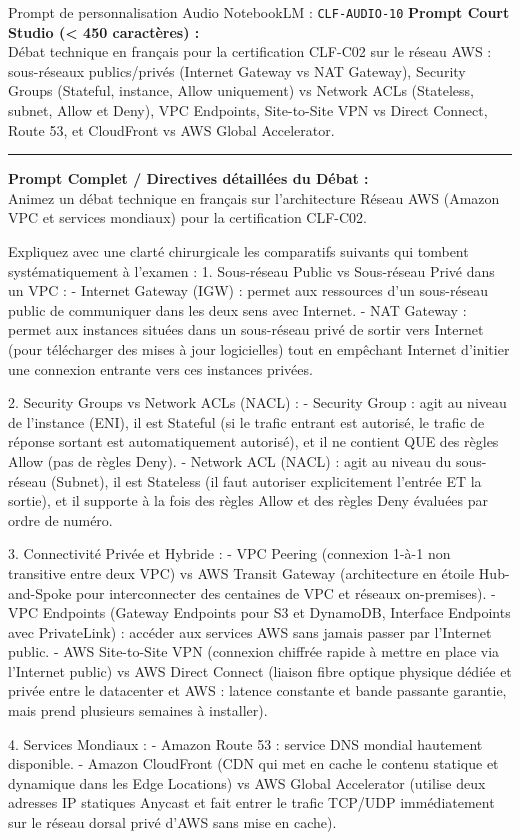 \documentclass[11pt,a4paper]{article}
\begin{document}
\begin{promptbox}{Prompt de personnalisation Audio NotebookLM : \texttt{CLF-AUDIO-10}}
\textbf{Prompt Court Studio (< 450 caractères) :}\\
Débat technique en français pour la certification CLF-C02 sur le réseau AWS : sous-réseaux publics/privés (Internet Gateway vs NAT Gateway), Security Groups (Stateful, instance, Allow uniquement) vs Network ACLs (Stateless, subnet, Allow et Deny), VPC Endpoints, Site-to-Site VPN vs Direct Connect, Route 53, et CloudFront vs AWS Global Accelerator.

\medskip\hrule\medskip
\textbf{Prompt Complet / Directives détaillées du Débat :}\\
Animez un débat technique en français sur l'architecture Réseau AWS (Amazon VPC et services mondiaux) pour la certification CLF-C02.

Expliquez avec une clarté chirurgicale les comparatifs suivants qui tombent systématiquement à l'examen :
1. Sous-réseau Public vs Sous-réseau Privé dans un VPC :
- Internet Gateway (IGW) : permet aux ressources d'un sous-réseau public de communiquer dans les deux sens avec Internet.
- NAT Gateway : permet aux instances situées dans un sous-réseau privé de sortir vers Internet (pour télécharger des mises à jour logicielles) tout en empêchant Internet d'initier une connexion entrante vers ces instances privées.

2. Security Groups vs Network ACLs (NACL) :
- Security Group : agit au niveau de l'instance (ENI), il est Stateful (si le trafic entrant est autorisé, le trafic de réponse sortant est automatiquement autorisé), et il ne contient QUE des règles Allow (pas de règles Deny).
- Network ACL (NACL) : agit au niveau du sous-réseau (Subnet), il est Stateless (il faut autoriser explicitement l'entrée ET la sortie), et il supporte à la fois des règles Allow et des règles Deny évaluées par ordre de numéro.

3. Connectivité Privée et Hybride :
- VPC Peering (connexion 1-à-1 non transitive entre deux VPC) vs AWS Transit Gateway (architecture en étoile Hub-and-Spoke pour interconnecter des centaines de VPC et réseaux on-premises).
- VPC Endpoints (Gateway Endpoints pour S3 et DynamoDB, Interface Endpoints avec PrivateLink) : accéder aux services AWS sans jamais passer par l'Internet public.
- AWS Site-to-Site VPN (connexion chiffrée rapide à mettre en place via l'Internet public) vs AWS Direct Connect (liaison fibre optique physique dédiée et privée entre le datacenter et AWS : latence constante et bande passante garantie, mais prend plusieurs semaines à installer).

4. Services Mondiaux :
- Amazon Route 53 : service DNS mondial hautement disponible.
- Amazon CloudFront (CDN qui met en cache le contenu statique et dynamique dans les Edge Locations) vs AWS Global Accelerator (utilise deux adresses IP statiques Anycast et fait entrer le trafic TCP/UDP immédiatement sur le réseau dorsal privé d'AWS sans mise en cache).
\end{promptbox}
\end{document}
